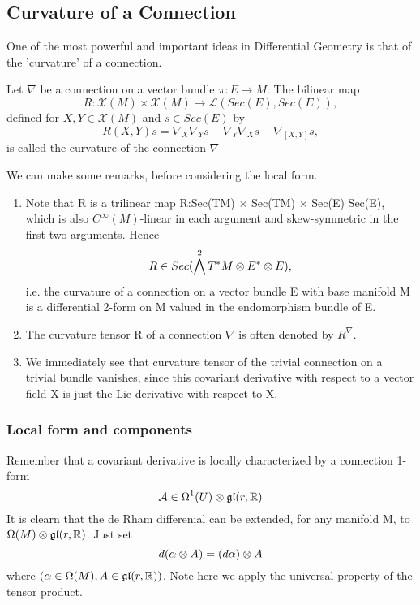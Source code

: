 \subsection{Curvature of a Connection}
One of the most powerful and important ideas in Differential Geometry is that of the 'curvature' of a connection.
\begin{dfn} Let $\nabla$ be a connection on a vector bundle $\pi: E \to M$. The bilinear map 
 \begin{equation}
  R: \mathcal{X}(M)\times \mathcal{X}(M) \to \mathcal{L}(Sec(E), Sec(E)),
 \end{equation}
defined for $X,Y \in \mathcal{X}(M)$ and $s \in Sec(E)$ by
\begin{equation}
 R(X,Y)s = \nabla_{X} \nabla_{Y}s -\nabla_{Y} \nabla_{X}s - \nabla_{[X,Y]}s,
\end{equation}
is called the curvature of the connection $\nabla$
\end{dfn}
We can make some remarks, before considering the local form. 
\begin{rem}
 \begin{enumerate}
  \item Note that R is a trilinear map R:Sec(TM) $\times $ Sec(TM) $\times$ Sec(E) \To Sec(E), which is also 
$C^{\infty}(M)$-linear in each argument and skew-symmetric in the first two arguments. Hence
 \begin{equation}
  R \in Sec(\bigwedge^{2} T^{*}M \otimes E^{*} \otimes E),
 \end{equation}
i.e. the curvature of a connection on a vector bundle E with base manifold M is a differential 2-form on M valued
in the endomorphism bundle of E.
\item The curvature tensor R of a connection $\nabla$ is often denoted by $R^{\nabla}$.
\item We immediately see that curvature tensor of the trivial connection on a trivial bundle vanishes, since this
covariant derivative with respect to a vector field X is just the Lie derivative with respect to X. 
 \end{enumerate}

\end{rem}
\subsubsection{Local form and components}
Remember that a covariant derivative is locally characterized by a connection 1-form 
\begin{equation}
 \mathcal{A} \in \Omega^{1}(U) \otimes \mathfrak{gl}(r,\mathbb{R})
\end{equation}
It is clearn that the de Rham differenial can be extended, for any manifold M, to $\Omega(M) \otimes \mathfrak{gl}(r,
\mathbb{R})$.
Just set 
\begin{equation}
 d(\alpha \otimes A) = (d\alpha) \otimes A
\end{equation}
where $(\alpha \in \Omega(M), A \in \mathfrak{gl}(r,\mathbb{R}))$. Note here we apply the universal property of 
the tensor product. 
  